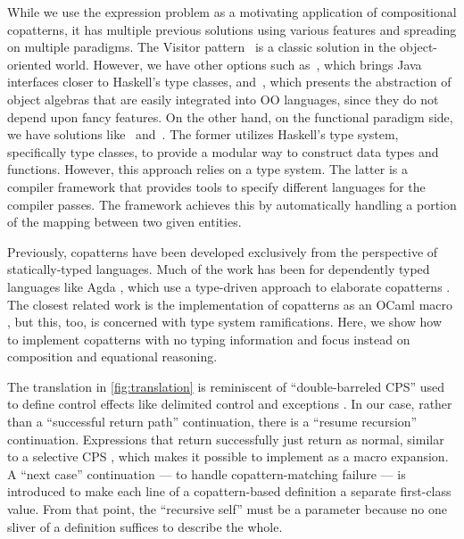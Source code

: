 While we use the expression problem as a motivating application of compositional copatterns, it has multiple previous solutions using various features and spreading on multiple paradigms.
The Visitor pattern~\cite{GangOfFour} is a classic solution in the object-oriented world.
However, we have other options such as~\cite{wehr_javagi_2011}, which brings Java interfaces closer to Haskell's type classes, and~\cite{hutchison_extensibility_2012}, which presents the abstraction of object algebras that are easily integrated into OO languages, since they do not depend upon fancy features.
On the other hand, on the functional paradigm side, we have solutions like~\cite{swierstra_data_2008} and~\cite{keep_nanopass_2013}.
The former utilizes Haskell's type system, specifically type classes, to provide a modular way to construct data types and functions.
However, this approach relies on a type system.
The latter is a compiler framework that provides tools to specify different languages for the compiler passes. The framework achieves this by automatically handling a portion of the mapping between two given entities.

Previously, copatterns have been developed exclusively from the perspective of statically-typed languages.
Much of the work has been for dependently typed languages like Agda \cite{ElaboratingDependentCopatterns}, which use a type-driven approach to elaborate copatterns \cite{UnnestingCopatterns,ThibodeauMasters}.
The closest related work is the implementation of copatterns as an OCaml macro \cite{LaforgueR17}, but this, too, is concerned with type system ramifications.
Here, we show how to implement copatterns with no typing information and focus instead on composition and equational reasoning.

The translation in \cref{fig:translation} is reminiscent of ``double-barreled CPS'' \cite{DoubleBarrelCPS} used to define control effects like delimited control \cite{AbstractingControl} and exceptions \cite{KimYiDanvy98}.
In our case, rather than a ``successful return path'' continuation, there is a ``resume recursion'' continuation.
Expressions that return successfully just return as normal, similar to a selective CPS \cite{SelectiveCPS}, which makes it possible to implement as a macro expansion.
A ``next case'' continuation --- to handle copattern-matching failure --- is introduced to make each line of a copattern-based definition a separate first-class value.
From that point, the ``recursive self'' must be a parameter because no one sliver of a definition suffices to describe the whole.

